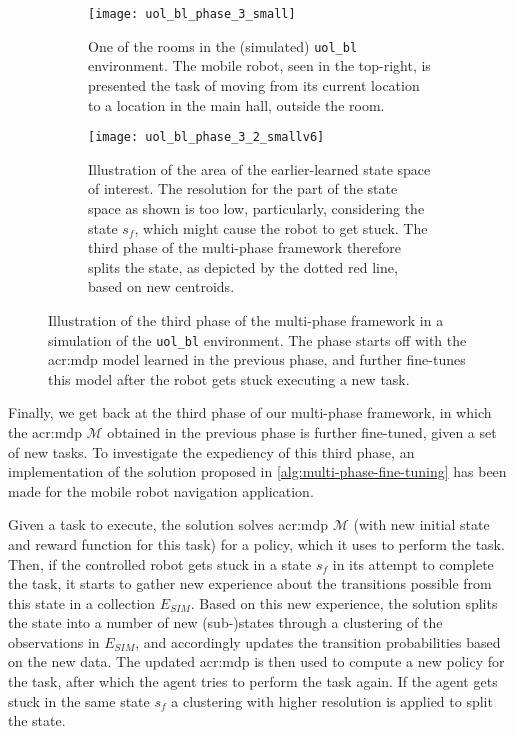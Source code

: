 \begin{figure}
	\centering
	\captionsetup{font=small}
	\captionsetup[subfigure]{font=footnotesize}
	\begin{subfigure}{0.475\textwidth}
		\centering
		\texttt{[image: uol\_bl\_phase\_3\_small]}
		\caption{One of the rooms in the (simulated) \texttt{uol\_bl} environment. The mobile robot, seen in the top-right, is presented the task of moving from its current location to a location in the main hall, outside the room.}
		\label{fig:uol_bl_tuning_1}
	\end{subfigure}
	\hfill
	\begin{subfigure}{0.475\textwidth}
		\centering
		\vspace{19.5pt}
		\texttt{[image: uol\_bl\_phase\_3\_2\_smallv6]}
		\caption{Illustration of the area of the earlier-learned state space of interest. The resolution for the part of the state space as shown is too low, particularly, considering the state $s_f$, which might cause the robot to get stuck. The third phase of the multi-phase framework therefore splits the state, as depicted by the dotted red line, based on new centroids.}
		\label{fig:uol_bl_tuning_2}
	\end{subfigure}
	\bigskip
	
	\caption{Illustration of the third phase of the multi-phase framework in a simulation of the \texttt{uol\_bl} environment. The phase starts off with the \acrshort{acr:mdp} model learned in the previous phase, and further fine-tunes this model after the robot gets stuck executing a new task.}
	\label{fig:uol_bl_tuning}
\end{figure}

Finally, we get back at the third phase of our multi-phase framework, in which the \acrshort{acr:mdp} $\mathcal{M}$ obtained in the previous phase is further fine-tuned, given a set of new tasks.
To investigate the expediency of this third phase, an implementation of the solution proposed in \autoref{alg:multi-phase-fine-tuning} has been made for the mobile robot navigation application.

Given a task to execute, the solution solves \acrshort{acr:mdp} $\mathcal{M}$ (with new initial state and reward function for this task) for a policy, which it uses to perform the task.
Then, if the controlled robot gets stuck in a state $s_f$ in its attempt to complete the task, it starts to gather new experience about the transitions possible from this state in a collection $E_\mathit{SIM}$.
Based on this new experience, the solution splits the state into a number of new (sub-)states through a clustering of the observations in $E_\mathit{SIM}$, and accordingly updates the transition probabilities based on the new data.
The updated \acrshort{acr:mdp} is then used to compute a new policy for the task, after which the agent tries to perform the task again.
If the agent gets stuck in the same state $s_f$ a clustering with higher resolution is applied to split the state.

